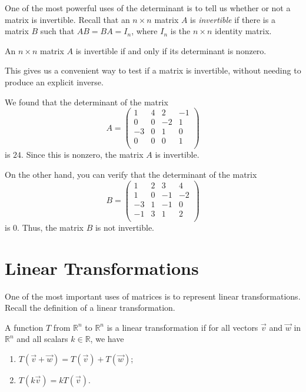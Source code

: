 \documentclass{ximera}
\begin{document}
One of the most powerful uses of the determinant is to tell us whether or not a matrix is invertible. Recall that an $n\times n$ matrix $A$ is \emph{invertible} if there is a matrix $B$ such that $AB=BA = I_n$, where $I_n$ is the $n\times n$ identity matrix.

\begin{proposition}
An $n\times n$ matrix $A$ is invertible if and only if its determinant is nonzero.
\end{proposition}

This gives us a convenient way to test if a matrix is invertible, without needing to produce an explicit inverse.

\begin{example}
We found that the determinant of the matrix
\[
A = \left(\begin{array}{cccc}
1 & 4 & 2 & -1\\
0 & 0 & -2 & 1\\
-3 & 0 & 1 & 0\\
0 & 0 & 0 & 1\\
\end{array}\right)
\]
is $24$. Since this is nonzero, the matrix $A$ is invertible.

On the other hand, you can verify that the determinant of the matrix
\[
B = \left(\begin{array}{cccc}
1 & 2 & 3 & 4\\
1 & 0 & -1 & -2\\
-3 & 1 & -1 & 0\\
-1 & 3 & 1 & 2\\
\end{array}\right)
\]
is $0$. Thus, the matrix $B$ is not invertible.
\end{example}

\section*{Linear Transformations}

One of the most important uses of matrices is to represent linear transformations. Recall the definition of a linear transformation.

\begin{definition}
A function $T$ from $\mathbb{R}^n$ to $\mathbb{R}^n$ is a linear transformation if for all vectors $\vec{v}$ and $\vec{w}$ in $\mathbb{R}^n$ and all scalars $k\in\mathbb{R}$, we have
\begin{enumerate}
\item $T(\vec{v}+\vec{w}) = T(\vec{v})+T(\vec{w})$;
\item  $T(k\vec{v}) = kT(\vec{v})$.
\end{enumerate}
\end{definition}
\end{document}

